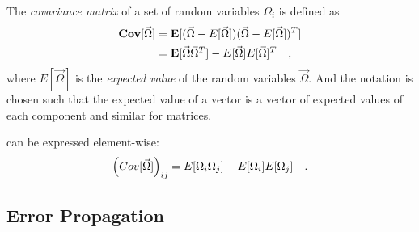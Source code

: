 The \emph{covariance matrix} of a set of random variables $\Omega_i$ is defined as
%
\begin{align}
    \mathbf{Cov}[\vec{\Omega}] &= \mathbf{E}[(\vec{\Omega} - E[\vec{\Omega}])(\vec{\Omega} - E[\vec{\Omega}])^T]
    \notag \\
    &= \mathbf{E}[\vec{\Omega}\vec{\Omega}^T] - E[\vec{\Omega}]E[\vec{\Omega}]^T
    \quad ,
    \label{eq_def_cov}
\end{align}
%
where $E[\vec{\Omega}]$ is the \emph{expected value} of the random variables $\vec{\Omega}$. And the
notation is chosen such that the expected value of a vector is a vector
of expected values of each component and similar for matrices.

 can be expressed element-wise:
%
\begin{equation}
    \left(Cov[\vec{\Omega}]\right)_{ij} = E[\Omega_i\Omega_j] - E[\Omega_i]E[\Omega_j]
    \label{eq_cov_form}
    \quad .
\end{equation}
%
\subsection{Error Propagation}

